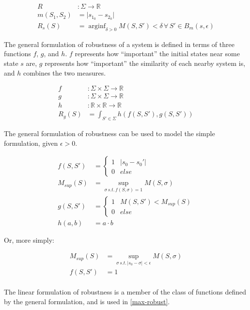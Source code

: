 \documentclass{article}
\DeclareMathOperator*{\arginf}{arginf}
\begin{document}
\begin{align}
  R &: \Sigma \to \mathbb{R} \\
  m(S_1, S_2) &= \lvert s_{1_0} - s_{2_0} \rvert \label{example-metric} \\
  R_s(S) &= \arginf_{\delta > 0} M(S, S') < \delta \,\forall\, S' \in B_m(s, \epsilon)
\end{align}

The general formulation of robustness of a system is defined in terms of three functions $f$, $g$, and $h$. $f$ represents how ``important'' the initial states near some state $s$ are, $g$ represents how ``important'' the similarity of each nearby system is, and $h$ combines the two measures.

\begin{align}
  f &: \Sigma \times \Sigma \to \mathbb{R} \\
  g &: \Sigma \times \Sigma \to \mathbb{R} \\
  h &: \mathbb{R} \times \mathbb{R} \to \mathbb{R} \\
  R_g(S) &= \int_{S' \in \Sigma} h(f(S, S'), g(S, S'))
\end{align}

The general formulation of robustness can be used to model the simple formulation, given $\epsilon > 0$.

\begin{align}
  f(S, S') &= \begin{cases}
    1 & \lvert s_0 - s_0' \rvert \\
    0 & else
  \end{cases} \\
  M_{sup}(S) &= \sup\limits_{\sigma \,s.t.\, f(S, \sigma) = 1} M(S, \sigma) \\
  g(S, S') &= \begin{cases}
    1 & M(S, S') < M_{sup}(S) \\
    0 & else
  \end{cases} \\
  h(a, b) &= a \cdot b
\end{align}

Or, more simply:

\begin{align}
  M_{sup}(S) &= \sup\limits_{\sigma \,s.t.\, \lvert s_0 - \sigma \rvert < \epsilon} M(S, \sigma) \\
  f(S, S') &= 1 \\
\end{align}

The linear formulation of robustness is a member of the class of functions defined by the general formulation, and is used in \ref{max-robust}.
\end{document}
